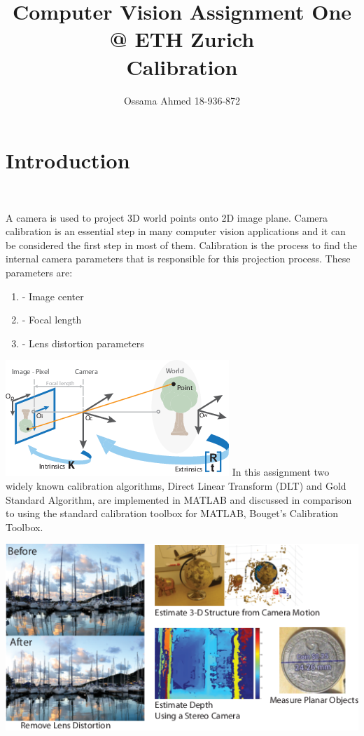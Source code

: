 \documentclass[]{article}
\title{Computer Vision Assignment One @ ETH Zurich \\ \large Calibration}
\author{Ossama Ahmed 18-936-872}
\begin{document}
\maketitle

\section{Introduction}\

A camera is used to project 3D world points onto 2D image plane. Camera calibration is an essential step in many computer vision applications and it can be considered the first step in most of them. Calibration is the process to find the internal camera parameters that is responsible for this projection process. These parameters are:
\begin{enumerate}
\item - Image center
\item - Focal length
\item - Lens distortion parameters
\end{enumerate}
\includegraphics{calibration_overview.png}
\break
In this assignment two widely known calibration algorithms, Direct Linear Transform (DLT) and Gold Standard Algorithm, are implemented in MATLAB and discussed in comparison to using the standard calibration toolbox for MATLAB, Bouget's Calibration Toolbox. 
\newline

\includegraphics{example.png}
\end{document}
